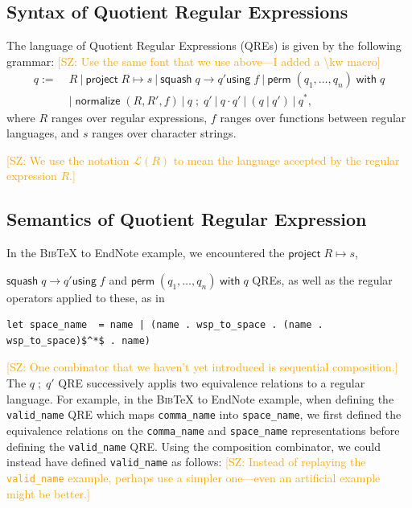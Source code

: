 \documentclass{svproc}
\newcommand{\cd}[1]{\lstinline[backgroundcolor=\color{white}]$#1$}
\newcommand{\FINISH}[3]{\ifdraft\textcolor{#1}{[#2: #3]}\fi}
\newcommand{\saz}[1]{\FINISH{orange}{SZ}{#1}}
\newcommand{\kw}[1]{\ensuremath{\mathsf{#1}}}
\newcommand{\project}[2]{\ensuremath{\kw{project} \; #1 \mapsto #2}}
\newcommand{\squash}[3]{\ensuremath{\kw{squash} \; #1 \rightarrow #2
\kw{using} \; #3}}
\newcommand{\perm}[2]{\ensuremath{\kw{perm}\; (#1)\; \kw{with}\; #2}}
\newcommand{\normalize}[3]{\ensuremath{\kw{normalize} \; (#1, #2, #3)}}
\newcommand{\sep}{\ensuremath{\ | \ }}
\newcommand{\bibtex}{\textsc{Bib}\TeX{}}
\newcommand{\semicolon}{\ensuremath{\; ; \;}}
\begin{document}
\subsection{Syntax of Quotient Regular Expressions}
The language of Quotient Regular Expressions (QREs) is given by the following
grammar:  \saz{Use the same font that we use above---I added a \textbackslash kw
macro}
\begin{align*}
q := \; &R \sep \project{R}{s} \sep \squash{q}{q'}{f} \sep
\perm{q_1, \ldots, q_n}{q} \\
  & | \; \normalize{R}{R'}{f} \sep q \semicolon q' \sep q \cdot q' \sep (q \sep q') \sep q^*,
\end{align*}
where $R$ ranges over regular expressions, $f$ ranges over functions between
regular languages, and $s$ ranges over character strings.

\saz{We use the notation $\mathcal{L}(R)$ to mean the language accepted by the
  regular expression $R$.}


\subsection{Semantics of Quotient Regular Expression}
In the \bibtex{} to EndNote example, we encountered the $\project{R}{s}$,

\noindent $\squash{q}{q'}{f}$ and $\perm{q_1, \ldots, q_n}{q}$ QREs, as well as
the regular operators applied to these, as in

\begin{lstlisting}
let space_name  = name | (name . wsp_to_space . (name . wsp_to_space)$^*$ . name)
\end{lstlisting}

\saz{One combinator that we haven't yet introduced is sequential composition.}
The $q \semicolon q'$ QRE successively applis
two equivalence relations to a regular language. For example, in the \bibtex{}
to EndNote example, when defining the \cd{valid_name} QRE which maps
\cd{comma_name} into \cd{space_name}, we first defined the equivalence
relations on the \cd{comma_name} and \cd{space_name} representations before
defining the \cd{valid_name} QRE. Using the composition combinator, we could
instead have defined \cd{valid_name} as follows:
\saz{Instead of replaying the \cd{valid_name} example, perhaps use a simpler
  one---even an artificial example might be better.}
\end{document}
